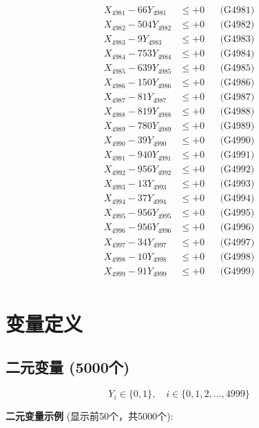 \documentclass[a4paper,10pt]{article}
\begin{document}
{\begin{align}
\allowbreak
X_{4981} - 66Y_{4981} &\leq +0 && \text{(G4981)} \\
X_{4982} - 504Y_{4982} &\leq +0 && \text{(G4982)} \\
X_{4983} - 9Y_{4983} &\leq +0 && \text{(G4983)} \\
X_{4984} - 753Y_{4984} &\leq +0 && \text{(G4984)} \\
X_{4985} - 639Y_{4985} &\leq +0 && \text{(G4985)} \\
X_{4986} - 150Y_{4986} &\leq +0 && \text{(G4986)} \\
X_{4987} - 81Y_{4987} &\leq +0 && \text{(G4987)} \\
X_{4988} - 819Y_{4988} &\leq +0 && \text{(G4988)} \\
X_{4989} - 780Y_{4989} &\leq +0 && \text{(G4989)} \\
X_{4990} - 39Y_{4990} &\leq +0 && \text{(G4990)} \\
\allowbreak
X_{4991} - 940Y_{4991} &\leq +0 && \text{(G4991)} \\
X_{4992} - 956Y_{4992} &\leq +0 && \text{(G4992)} \\
X_{4993} - 13Y_{4993} &\leq +0 && \text{(G4993)} \\
X_{4994} - 37Y_{4994} &\leq +0 && \text{(G4994)} \\
X_{4995} - 956Y_{4995} &\leq +0 && \text{(G4995)} \\
X_{4996} - 956Y_{4996} &\leq +0 && \text{(G4996)} \\
X_{4997} - 34Y_{4997} &\leq +0 && \text{(G4997)} \\
X_{4998} - 10Y_{4998} &\leq +0 && \text{(G4998)} \\
X_{4999} - 91Y_{4999} &\leq +0 && \text{(G4999)} \\
\end{align}
}

\section{变量定义}

\subsection{二元变量 (5000个)}

\begin{equation}
Y_i \in \{0,1\}, \quad i \in \{0, 1, 2, \ldots, 4999\}
\end{equation}

\textbf{二元变量示例} (显示前50个，共5000个):
\end{document}
